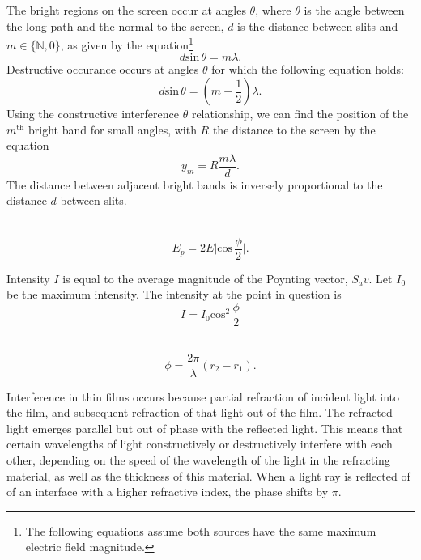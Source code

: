 \documentclass[nobib,notoc]{tufte-handout}
\begin{document}
\begin{defi}
	The bright regions on the screen occur at angles \(\theta\), where \(\theta\) is the angle between the long path and the normal to the screen, \(d\) is the distance between slits and \(m\in\{\mathbb{N},0\}\), as given by the equation\footnote{The following equations assume both sources have the same maximum electric field magnitude.}
	\begin{equation*}
		d\text{sin}\,\theta=m\lambda.
	\end{equation*}
	Destructive occurance occurs at angles \(\theta\) for which the following equation holds:
	\begin{equation*}
		d\text{sin}\,\theta=(m+\frac{1}{2})\lambda.
	\end{equation*}
	Using the constructive interference \(\theta\) relationship, we can find the position of the \(m^{\text{th}}\) bright band for small angles, with \(R\) the distance to the screen by the equation
	\begin{equation*}
		y_m=R\frac{m\lambda}{d}.
	\end{equation*}
	The distance between adjacent bright bands is inversely proportional to the distance \(d\) between slits.
\end{defi}
\begin{defi}
	\,
	\begin{equation*}
		E_p=2E\lvert\text{cos}\,\frac{\phi}{2}\rvert.
	\end{equation*}
\end{defi}
\begin{defi}
	Intensity \(I\) is equal to the average magnitude of the Poynting vector, \(S_av\). Let \(I_0\) be the maximum intensity. The intensity at the point in question is
	\begin{equation*}
		I=I_0\text{cos}^2\,\frac{\phi}{2}
	\end{equation*}
\end{defi}
\begin{defi}
	\,
	\begin{equation*}
		\phi=\frac{2\pi}{\lambda}(r_2-r_1).
	\end{equation*}
\end{defi}
\begin{rema}
	Interference in thin films occurs because partial refraction of incident light into the film, and subsequent refraction of that light out of the film. The refracted light emerges parallel but out of phase with the reflected light. This means that certain wavelengths of light constructively or destructively interfere with each other, depending on the speed of the wavelength of the light in the refracting material, as well as the thickness of this material. When a light ray is reflected of of an interface with a higher refractive index, the phase shifts by \(\pi\).
\end{rema}
\end{document}

